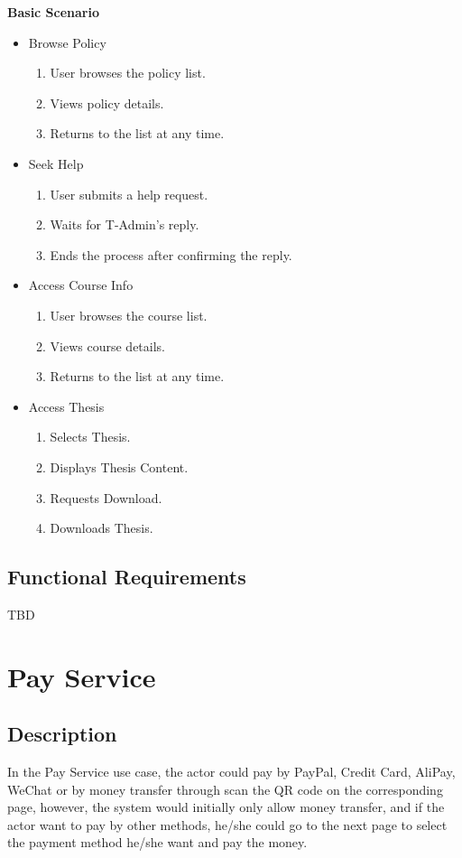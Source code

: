 \textbf{Basic Scenario}
\begin{itemize}
\item{Browse Policy}
    \begin{enumerate}
        \item User browses the policy list.
        \item Views policy details.
        \item Returns to the list at any time.
    \end{enumerate}

\item{Seek Help}
    \begin{enumerate}
        \item User submits a help request.
        \item Waits for T-Admin's reply.
        \item Ends the process after confirming the reply.
    \end{enumerate}

\item{Access Course Info}
    \begin{enumerate}
        \item User browses the course list.
        \item Views course details.
        \item Returns to the list at any time.
    \end{enumerate}

\item{Access Thesis}
    \begin{enumerate}
        \item Selects Thesis.
        \item Displays Thesis Content.
        \item Requests Download.
        \item Downloads Thesis.
    \end{enumerate}
\end{itemize}


\subsection{Functional Requirements}

TBD

\section{Pay Service}

\subsection{Description}
In the Pay Service use case, the actor could pay by PayPal, Credit Card, AliPay, WeChat or by money transfer through scan the QR code on the corresponding page, however, the system would initially only allow money transfer, and if the actor want to pay by other methods, he/she could go to the next page to select the payment method he/she want and pay the money.

